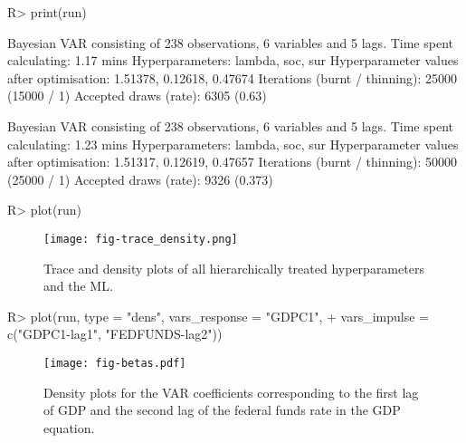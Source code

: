 \documentclass[article,nojss]{jss} %
\begin{document}
\begin{Schunk}
\begin{Sinput}
R> print(run)
\end{Sinput}
\begin{Soutput}
Bayesian VAR consisting of 238 observations, 6 variables and 5 lags.
Time spent calculating: 1.17 mins
Hyperparameters: lambda, soc, sur 
Hyperparameter values after optimisation: 1.51378, 0.12618, 0.47674
Iterations (burnt / thinning): 25000 (15000 / 1)
Accepted draws (rate): 6305 (0.63)
\end{Soutput}
\end{Schunk}

\begin{Soutput}
  Bayesian VAR consisting of 238 observations, 6 variables and 5 lags.
  Time spent calculating: 1.23 mins
  Hyperparameters: lambda, soc, sur
  Hyperparameter values after optimisation: 1.51317, 0.12619, 0.47657
  Iterations (burnt / thinning): 50000 (25000 / 1)
  Accepted draws (rate): 9326 (0.373)
\end{Soutput}

\begin{Schunk}
\begin{Sinput}
R> plot(run)
\end{Sinput}
\end{Schunk}

\begin{figure}[!ht]
	\centering
  \texttt{[image: fig-trace\_density.png]}
	\caption{Trace and density plots of all hierarchically treated hyperparameters and the ML.}
	\label{fig:trace_density}
\end{figure}

\begin{Schunk}
\begin{Sinput}
R> plot(run, type = "dens", vars_response = "GDPC1",
+    vars_impulse = c("GDPC1-lag1", "FEDFUNDS-lag2"))
\end{Sinput}
\end{Schunk}

\begin{figure}[!ht]
	\centering
  \texttt{[image: fig-betas.pdf]}
	\caption{Density plots for the VAR coefficients corresponding to the first lag of GDP and the second lag of the federal funds rate in the GDP equation.}
	\label{fig:betas}
\end{figure}
\end{document}
